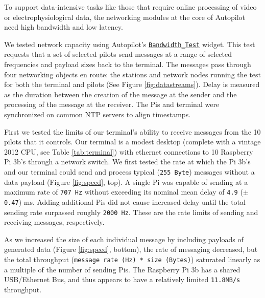 \documentclass[nohyper, justified, notitlepage, marginals=raggedright,twoside=false,debug]{tufte-autopilot}
\begin{document}
To support data-intensive tasks like those that require online processing of video or electrophysiological data, the networking modules at the core of Autopilot need high bandwidth and low latency. 

We tested network capacity using Autopilot's \href{http://docs.auto-pi-lot.com/autopilot.core.gui.html#autopilot.core.gui.Bandwidth_Test}{\texttt{Bandwidth\_Test}} widget. This test requests that a set of selected pilots send messages at a range of selected frequencies and payload sizes back to the terminal. The messages pass through four networking objects en route: the stations and network nodes running the test for both the terminal and pilots (See Figure \ref{fig:datastreams}). Delay is measured as the duration between the creation of the message at the sender and the processing of the message at the receiver. The Pis and terminal were synchronized on common NTP servers to align timestamps. 

First we tested the limits of our terminal's ability to receive messages from the 10 pilots that it controls. Our terminal is a modest desktop (complete with a vintage 2012 CPU, see Table \ref{tab:terminal}) with ethernet connections to 10 Raspberry Pi 3b's through a network switch. We first tested the rate at which the Pi 3b's and our terminal could send and process typical (\texttt{255 Byte}) messages without a data payload (Figure \ref{fig:speed}, top). A single Pi was capable of sending at a maximum rate of \texttt{707 Hz} without exceeding its nominal mean delay of \texttt{4.9} ($\pm$ \texttt{0.47}) ms. Adding additional Pis did not cause increased delay until the total sending rate surpassed roughly \texttt{2000 Hz}. These are the rate limits of sending and receiving messages, respectively.

As we increased the size of each individual message by including payloads of generated data (Figure \ref{fig:speed}, bottom), the rate of messaging decreased, but the total throughput (\texttt{message rate (Hz) * size (Bytes)}) saturated linearly as a multiple of the number of sending Pis. The Raspberry Pi 3b has a shared USB/Ethernet Bus, and thus appears to have a relatively limited \texttt{11.8MB/s} throughput.
\end{document}
